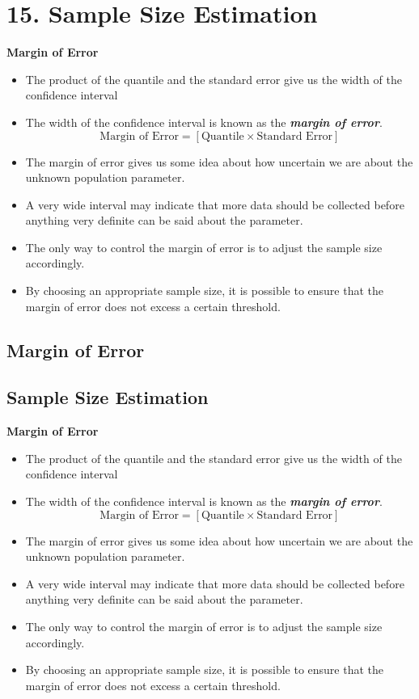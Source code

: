 
\chapter{15. Sample Size Estimation}

\textbf{Margin of Error}

\begin{itemize}
\item  The product of the quantile and the standard error give us the width of the confidence interval
\item  The width of the confidence interval is known as the \textbf{\emph{margin of error}}.  \[ \mbox{Margin of Error}  = \left[ \mbox{Quantile} \times \mbox{Standard Error} \right] \]
\item  The margin of error gives us some idea about how uncertain we are about the unknown population parameter. \item  A very wide interval may indicate that more data should be collected before anything very definite can be said about the parameter.
\item  The only way to control the margin of error is to adjust the sample size accordingly.
\item  By choosing an appropriate sample size, it is possible to ensure that the margin of error does not excess a certain threshold.
\end{itemize}







\section{Margin of Error}


\section{Sample Size Estimation}

\textbf{Margin of Error}

\begin{itemize}
\item The product of the quantile and the standard error give us the width of the confidence interval
\item The width of the confidence interval is known as the \textbf{\emph{margin of error}}.  \[ \mbox{Margin of Error}  = \left[ \mbox{Quantile} \times \mbox{Standard Error} \right] \]
\item The margin of error gives us some idea about how uncertain we are about the unknown population parameter. \item A very wide interval may indicate that more data should be collected before anything very definite can be said about the parameter.
\item The only way to control the margin of error is to adjust the sample size accordingly.
\item By choosing an appropriate sample size, it is possible to ensure that the margin of error does not excess a certain threshold.
\end{itemize}
\newpage

